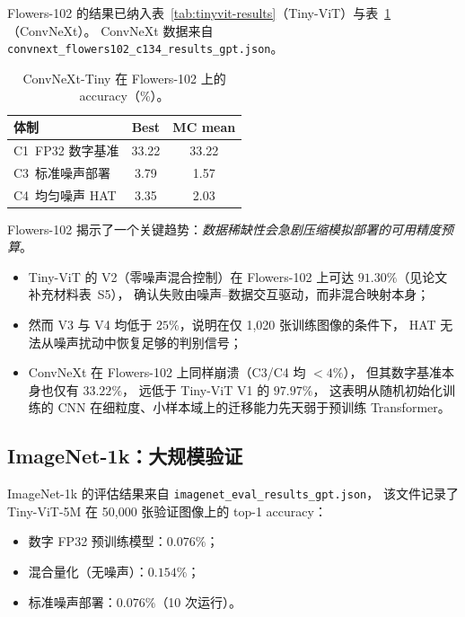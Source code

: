 Flowers-102 的结果已纳入表~\ref{tab:tinyvit-results}（Tiny-ViT）与表~\ref{tab:convnext-flowers}（ConvNeXt）。
ConvNeXt 数据来自 \texttt{convnext\_flowers102\_c134\_results\_gpt.json}。

\begin{table}[htbp]
\centering
\caption{ConvNeXt-Tiny 在 Flowers-102 上的 accuracy（\%）。}
\label{tab:convnext-flowers}
\begin{tabular}{@{}lcc@{}}
\toprule
\textbf{体制} & \textbf{Best} & \textbf{MC mean} \\
\midrule
C1~FP32 数字基准 & 33.22 & 33.22 \\
C3~标准噪声部署 & 3.79 & 1.57 \\
C4~均匀噪声 HAT & 3.35 & 2.03 \\
\bottomrule
\end{tabular}
\end{table}

Flowers-102 揭示了一个关键趋势：\emph{数据稀缺性会急剧压缩模拟部署的可用精度预算}。
\begin{itemize}
    \item Tiny-ViT 的 V2（零噪声混合控制）在 Flowers-102 上可达 $91.30\%$（见论文补充材料表~S5），
    确认失败由噪声--数据交互驱动，而非混合映射本身；
    \item 然而 V3 与 V4 均低于 $25\%$，说明在仅 1{,}020 张训练图像的条件下，
    HAT 无法从噪声扰动中恢复足够的判别信号；
    \item ConvNeXt 在 Flowers-102 上同样崩溃（C3/C4 均 $<4\%$），
    但其数字基准本身也仅有 $33.22\%$，
    远低于 Tiny-ViT V1 的 $97.97\%$，
    这表明从随机初始化训练的 CNN 在细粒度、小样本域上的迁移能力先天弱于预训练 Transformer。
\end{itemize}

\subsection{ImageNet-1k：大规模验证}

ImageNet-1k 的评估结果来自 \texttt{imagenet\_eval\_results\_gpt.json}，
该文件记录了 Tiny-ViT-5M 在 50{,}000 张验证图像上的 top-1 accuracy：

\begin{itemize}
    \item 数字 FP32 预训练模型：$0.076\%$；
    \item 混合量化（无噪声）：$0.154\%$；
    \item 标准噪声部署：$0.076\%$（10 次运行）。
\end{itemize}

